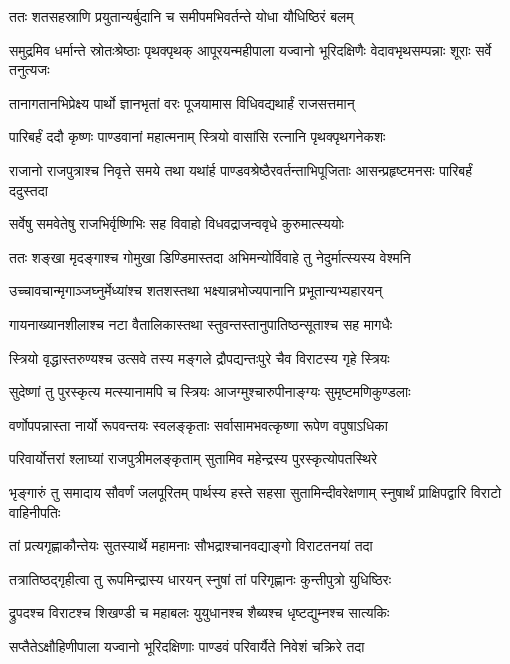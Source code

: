 \twolineshloka
{ततः शतसहस्राणि प्रयुतान्यर्बुदानि च}
{समीपमभिवर्तन्ते योधा यौधिष्ठिरं बलम्}


\threelineshloka
{समुद्रमिव धर्मान्ते स्रोतःश्रेष्ठाः पृथक्पृथक्}
{आपूरयन्महीपाला यज्वानो भूरिदक्षिणैः}
{वेदावभृथसम्पन्नाः शूराः सर्वे तनुत्यजः}


\twolineshloka
{तानागतानभिप्रेक्ष्य पार्थो ज्ञानभृतां वरः}
{पूजयामास विधिवद्यथार्हं राजसत्तमान्}


\twolineshloka
{पारिबर्हं ददौ कृष्णः पाण्डवानां महात्मनाम्}
{स्त्रियो वासांसि रत्नानि पृथक्पृथगनेकशः}


\threelineshloka
{राजानो राजपुत्राश्च निवृत्ते समये तथा}
{यथांर्ह पाण्डवश्रेष्ठैरवर्तन्ताभिपूजिताः}
{आसन्प्रहृष्टमनसः पारिबर्हं ददुस्तदा}


\twolineshloka
{सर्वेषु समवेतेषु राजभिर्वृष्णिभिः सह}
{विवाहो विधवद्राजन्ववृधे कुरुमात्स्ययोः}


\twolineshloka
{ततः शङ्खा मृदङ्गाश्च गोमुखा डिण्डिमास्तदा}
{अभिमन्योर्विवाहे तु नेदुर्मात्स्यस्य वेश्मनि}


\twolineshloka
{उच्चावचान्मृगाञ्जघ्नुर्मेध्यांश्च शतशस्तथा}
{भक्ष्यान्नभोज्यपानानि प्रभूतान्यभ्यहारयन्}


\twolineshloka
{गायनाख्यानशीलाश्च नटा वैतालिकास्तथा}
{स्तुवन्तस्तानुपातिष्ठन्सूताश्च सह मागधैः}


\twolineshloka
{स्त्रियो वृद्धास्तरुण्यश्च उत्सवे तस्य मङ्गले}
{द्रौपद्यन्तःपुरे चैव विराटस्य गृहे स्त्रियः}


\twolineshloka
{सुदेष्णां तु पुरस्कृत्य मत्स्यानामपि च स्त्रियः}
{आजग्मुश्चारुपीनाङ्ग्यः सुमृष्टमणिकुण्डलाः}


\twolineshloka
{वर्णोपपन्नास्ता नार्यो रूपवन्तयः स्वलङ्कृताः}
{सर्वासामभवत्कृष्णा रूपेण वपुषाऽधिका}


\twolineshloka
{परिवार्योत्तरां श्लाघ्यां राजपुत्रीमलङ्कृताम्}
{सुतामिव महेन्द्रस्य पुरस्कृत्योपतस्थिरे}


\threelineshloka
{भृङ्गारुं तु समादाय सौवर्णं जलपूरितम्}
{पार्थस्य हस्ते सहसा सुतामिन्दीवरेक्षणाम्}
{स्नुषार्थं प्राक्षिपद्वारि विराटो वाहिनीपतिः}


\twolineshloka
{तां प्रत्यगृह्णाकौन्तेयः सुतस्यार्थे महामनाः}
{सौभद्राश्चानवद्याङ्गो विराटतनयां तदा}


\twolineshloka
{तत्रातिष्ठद्गृहीत्वा तु रूपमिन्द्रास्य धारयन्}
{स्नुषां तां परिगृह्णानः कुन्तीपुत्रो युधिष्ठिरः}


\twolineshloka
{द्रुपदश्च विराटश्च शिखण्डी च महाबलः}
{युयुधानश्च शैब्यश्च धृष्टद्युम्नश्च सात्यकिः}


\twolineshloka
{सप्तैतेऽक्षौहिणीपाला यज्वानो भूरिदक्षिणाः}
{पाण्डवं परिवार्यैते निवेशं चक्रिरे तदा}


